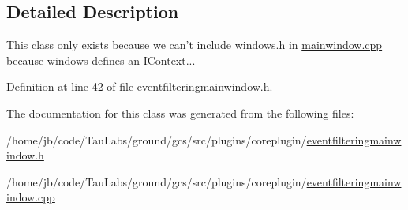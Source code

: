 \subsection{\-Detailed \-Description}
\-This class only exists because we can't include windows.\-h in \hyperlink{mainwindow_8cpp}{mainwindow.\-cpp} because windows defines an \hyperlink{class_core_1_1_i_context}{\-I\-Context}... 

\-Definition at line 42 of file eventfilteringmainwindow.\-h.



\-The documentation for this class was generated from the following files\-:\begin{DoxyCompactItemize}
\item 
/home/jb/code/\-Tau\-Labs/ground/gcs/src/plugins/coreplugin/\hyperlink{eventfilteringmainwindow_8h}{eventfilteringmainwindow.\-h}\item 
/home/jb/code/\-Tau\-Labs/ground/gcs/src/plugins/coreplugin/\hyperlink{eventfilteringmainwindow_8cpp}{eventfilteringmainwindow.\-cpp}\end{DoxyCompactItemize}
